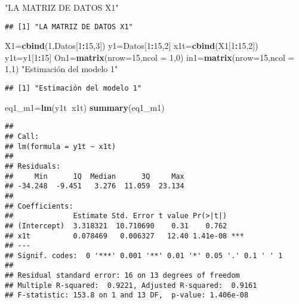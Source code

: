 \documentclass[
]{article}
\newenvironment{Shaded}{\begin{snugshade}}{\end{snugshade}}
\newcommand{\DataTypeTok}[1]{\textcolor[rgb]{0.13,0.29,0.53}{#1}}
\newcommand{\DecValTok}[1]{\textcolor[rgb]{0.00,0.00,0.81}{#1}}
\newcommand{\KeywordTok}[1]{\textcolor[rgb]{0.13,0.29,0.53}{\textbf{#1}}}
\newcommand{\NormalTok}[1]{#1}
\newcommand{\OperatorTok}[1]{\textcolor[rgb]{0.81,0.36,0.00}{\textbf{#1}}}
\newcommand{\StringTok}[1]{\textcolor[rgb]{0.31,0.60,0.02}{#1}}
\begin{document}
\begin{Shaded}
\begin{Highlighting}[]
\StringTok{"LA MATRIZ DE DATOS X1"}
\end{Highlighting}
\end{Shaded}

\begin{verbatim}
## [1] "LA MATRIZ DE DATOS X1"
\end{verbatim}

\begin{Shaded}
\begin{Highlighting}[]
\NormalTok{X1=}\KeywordTok{cbind}\NormalTok{(}\DecValTok{1}\NormalTok{,Datos[}\DecValTok{1}\OperatorTok{:}\DecValTok{15}\NormalTok{,}\DecValTok{3}\NormalTok{])}
\NormalTok{y1=Datos[}\DecValTok{1}\OperatorTok{:}\DecValTok{15}\NormalTok{,}\DecValTok{2}\NormalTok{]}
\NormalTok{x1t=}\KeywordTok{cbind}\NormalTok{(X1[}\DecValTok{1}\OperatorTok{:}\DecValTok{15}\NormalTok{,}\DecValTok{2}\NormalTok{])}
\NormalTok{y1t=y1[}\DecValTok{1}\OperatorTok{:}\DecValTok{15}\NormalTok{]}
\NormalTok{On1=}\KeywordTok{matrix}\NormalTok{(}\DataTypeTok{nrow=}\DecValTok{15}\NormalTok{,}\DataTypeTok{ncol =} \DecValTok{1}\NormalTok{,}\DecValTok{0}\NormalTok{)}
\NormalTok{in1=}\KeywordTok{matrix}\NormalTok{(}\DataTypeTok{nrow=}\DecValTok{15}\NormalTok{,}\DataTypeTok{ncol =} \DecValTok{1}\NormalTok{,}\DecValTok{1}\NormalTok{)}
\StringTok{"Estimación del modelo 1"}
\end{Highlighting}
\end{Shaded}

\begin{verbatim}
## [1] "Estimación del modelo 1"
\end{verbatim}

\begin{Shaded}
\begin{Highlighting}[]
\NormalTok{eq1_m1=}\KeywordTok{lm}\NormalTok{(y1t}\OperatorTok{~}\NormalTok{x1t)}
\KeywordTok{summary}\NormalTok{(eq1_m1)}
\end{Highlighting}
\end{Shaded}

\begin{verbatim}
## 
## Call:
## lm(formula = y1t ~ x1t)
## 
## Residuals:
##     Min      1Q  Median      3Q     Max 
## -34.248  -9.451   3.276  11.059  23.134 
## 
## Coefficients:
##              Estimate Std. Error t value Pr(>|t|)    
## (Intercept)  3.318321  10.710690    0.31    0.762    
## x1t          0.078469   0.006327   12.40 1.41e-08 ***
## ---
## Signif. codes:  0 '***' 0.001 '**' 0.01 '*' 0.05 '.' 0.1 ' ' 1
## 
## Residual standard error: 16 on 13 degrees of freedom
## Multiple R-squared:  0.9221, Adjusted R-squared:  0.9161 
## F-statistic: 153.8 on 1 and 13 DF,  p-value: 1.406e-08
\end{verbatim}
\end{document}
